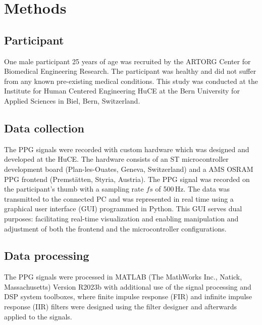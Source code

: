 
\section{Methods}
\subsection{Participant}
One male participant 25 years of age was recruited by the ARTORG Center for Biomedical Engineering Research. The participant was healthy and did not suffer from any known pre-existing medical conditions. This study was conducted at the Institute for Human Centered Engineering HuCE at the Bern University for Applied Sciences in Biel, Bern, Switzerland.

\subsection{Data collection}
The PPG signals were recorded with custom hardware which was designed and developed at the HuCE. The hardware consists of an ST microcontroller development board (Plan-les-Ouates, Geneva, Switzerland) and a AMS OSRAM PPG frontend (Premstätten, Styria, Austria). The PPG signal was recorded on the participant's thumb with a sampling rate $fs$ of 500\,Hz. The data was transmitted to the connected PC and was represented in real time using a  graphical user interface (GUI) programmed in Python. This GUI serves dual purposes: facilitating real-time visualization and enabling manipulation and adjustment of both the frontend and the microcontroller configurations.

\subsection{Data processing}
The PPG signals were processed in MATLAB (The MathWorks Inc., Natick, Massachusetts) Version R2023b with additional use of the signal processing and DSP system toolboxes, where finite impulse response (FIR) and infinite impulse response (IIR) filters were designed using the filter designer and afterwards applied to the signals. 

